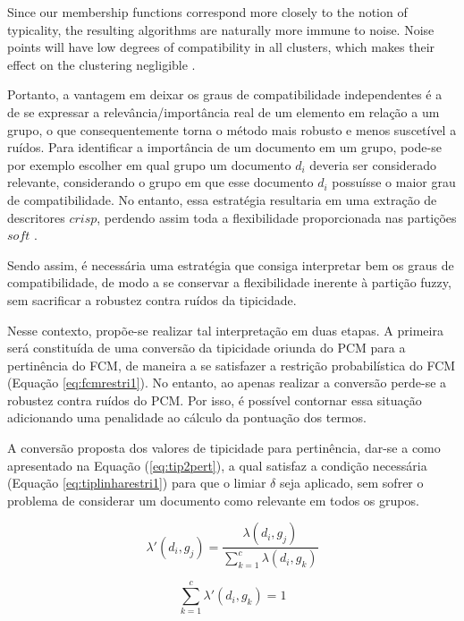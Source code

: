 \begin{citacao}
Since our membership functions correspond more closely to
the notion of typicality, the resulting algorithms are naturally
more immune to noise. Noise points will have low degrees
of compatibility in all clusters, which makes their effect on
the clustering negligible \cite{Krishnapuram1993}.
\end{citacao}
Portanto, a vantagem em deixar os graus de compatibilidade independentes é a de se expressar a
relevância/importância real de um elemento em relação a um grupo, o que consequentemente torna o
método mais robusto e menos suscetível a ruídos. Para identificar a importância de um
documento em um grupo, pode-se por exemplo escolher em qual grupo um documento $d_i$ deveria ser
considerado relevante, considerando o grupo em que esse documento $d_i$ possuísse o maior grau de
compatibilidade. No entanto, essa estratégia resultaria em uma extração de descritores $crisp$,
perdendo assim toda a flexibilidade proporcionada nas partições $soft$ \cite{Nogueira2013}.

Sendo assim, é necessária uma estratégia que consiga interpretar bem os graus de compatibilidade,
de modo a se conservar a flexibilidade inerente à partição fuzzy, sem sacrificar a robustez contra
ruídos da tipicidade. 

Nesse contexto, propõe-se realizar tal interpretação em duas etapas. A primeira será constituída de
uma conversão da tipicidade oriunda do PCM para a pertinência do FCM, de maneira a se satisfazer a
restrição probabilística do FCM (Equação \ref{eq:fcmrestri1}). No entanto, ao apenas realizar a
conversão perde-se a robustez contra ruídos do PCM. Por isso, é possível contornar essa situação
adicionando uma penalidade ao cálculo da pontuação dos termos.

A conversão proposta dos valores de tipicidade para pertinência, dar-se a como apresentado na
Equação (\ref{eq:tip2pert}), a qual satisfaz a condição necessária (Equação
\ref{eq:tiplinharestri1}) para que o limiar $\delta$ seja aplicado, sem sofrer o problema de
considerar um documento como relevante em todos os grupos.

\begin{equation}
  \lambda'(d_i,g_j) = \frac{\lambda(d_i,g_j)}{\sum_{k=1}^c \lambda(d_i,g_k)}
  \label{eq:tip2pert}
\end{equation}

\begin{equation}
  \sum_{k=1}^c \lambda'(d_i,g_k) = 1
  \label{eq:tiplinharestri1}
\end{equation}

